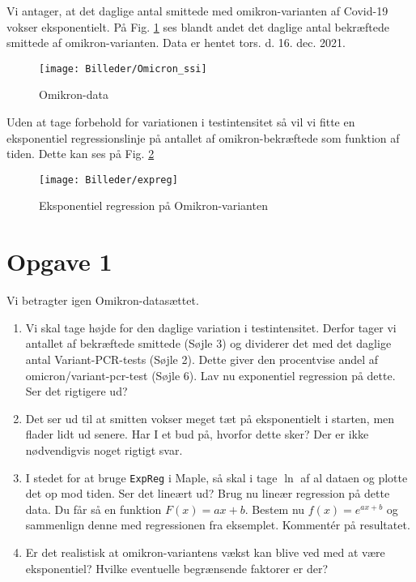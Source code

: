 \begin{exa}
Vi antager, at det daglige antal smittede med omikron-varianten af Covid-19 vokser eksponentielt. På Fig. \ref{fig:Omik} ses blandt andet det daglige antal bekræftede smittede af omikron-varianten. Data er hentet tors. d. 16. dec. 2021. 

\begin{figure}[H]
\center
\texttt{[image: Billeder/Omicron\_ssi]}
\caption{Omikron-data}
\label{fig:Omik}
\end{figure}

Uden at tage forbehold for variationen i testintensitet så vil vi fitte en eksponentiel regressionslinje på antallet af omikron-bekræftede som funktion af tiden. Dette kan ses på Fig. \ref{fig:Omikreg1}

\begin{figure}
\center
\texttt{[image: Billeder/expreg]}
\caption{Eksponentiel regression på Omikron-varianten}
\label{fig:Omikreg1}
\end{figure}

\end{exa}

\section*{Opgave 1}
Vi betragter igen Omikron-datasættet.
\begin{enumerate}[label=\roman*)]
\item Vi skal tage højde for den daglige variation i testintensitet. Derfor tager vi antallet af bekræftede smittede (Søjle 3) og dividerer det med det daglige antal Variant-PCR-tests (Søjle 2). Dette giver den procentvise andel af omicron/variant-pcr-test (Søjle 6). Lav nu exponentiel regression på dette. Ser det rigtigere ud?
\item Det ser ud til at smitten vokser meget tæt på eksponentielt i starten, men flader lidt ud senere. Har I et bud på, hvorfor dette sker? Der er ikke nødvendigvis noget rigtigt svar. 
\item I stedet for at bruge \texttt{ExpReg} i Maple, så skal i tage $\ln$ af al dataen og plotte det op mod tiden. Ser det lineært ud? Brug nu lineær regression på dette data. Du får så en funktion $F(x)=ax+b$. Bestem nu $f(x) = e^{ax+b}$ og sammenlign denne med regressionen fra eksemplet. Kommentér på resultatet.  
\item Er det realistisk at omikron-variantens vækst kan blive ved med at være eksponentiel? Hvilke eventuelle begrænsende faktorer er der?
\end{enumerate}
